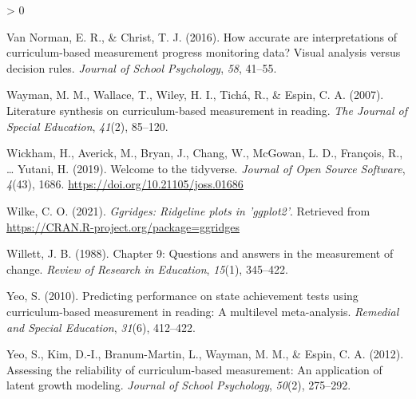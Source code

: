\documentclass[
  english,
  man, fleqn, noextraspace]{apa6}
\newlength{\cslhangindent}
\newenvironment{CSLReferences}[2] %
 {%
  \setlength{\parindent}{0pt}
  \ifodd #1 \everypar{\setlength{\hangindent}{\cslhangindent}}\ignorespaces\fi
  \ifnum #2 > 0
  \setlength{\parskip}{#2\baselineskip}
  \fi
 }%
 {}
\begin{document}
\begin{CSLReferences}{1}{0}
\leavevmode\hypertarget{ref-vannorman2016}{}%
Van Norman, E. R., \& Christ, T. J. (2016). How accurate are interpretations of curriculum-based measurement progress monitoring data? Visual analysis versus decision rules. \emph{Journal of School Psychology}, \emph{58}, 41--55.

\leavevmode\hypertarget{ref-wayman2007}{}%
Wayman, M. M., Wallace, T., Wiley, H. I., Tichá, R., \& Espin, C. A. (2007). Literature synthesis on curriculum-based measurement in reading. \emph{The Journal of Special Education}, \emph{41}(2), 85--120.

\leavevmode\hypertarget{ref-R-tidyverse}{}%
Wickham, H., Averick, M., Bryan, J., Chang, W., McGowan, L. D., François, R., \ldots{} Yutani, H. (2019). Welcome to the {tidyverse}. \emph{Journal of Open Source Software}, \emph{4}(43), 1686. \url{https://doi.org/10.21105/joss.01686}

\leavevmode\hypertarget{ref-R-ggridges}{}%
Wilke, C. O. (2021). \emph{Ggridges: Ridgeline plots in 'ggplot2'}. Retrieved from \url{https://CRAN.R-project.org/package=ggridges}

\leavevmode\hypertarget{ref-willett1988chapter}{}%
Willett, J. B. (1988). Chapter 9: Questions and answers in the measurement of change. \emph{Review of Research in Education}, \emph{15}(1), 345--422.

\leavevmode\hypertarget{ref-yeo2010}{}%
Yeo, S. (2010). Predicting performance on state achievement tests using curriculum-based measurement in reading: A multilevel meta-analysis. \emph{Remedial and Special Education}, \emph{31}(6), 412--422.

\leavevmode\hypertarget{ref-yeoetal2012}{}%
Yeo, S., Kim, D.-I., Branum-Martin, L., Wayman, M. M., \& Espin, C. A. (2012). Assessing the reliability of curriculum-based measurement: An application of latent growth modeling. \emph{Journal of School Psychology}, \emph{50}(2), 275--292.

\end{CSLReferences}

\endgroup

\appendix

\hypertarget{section}{%
\section{}\label{section}}
\end{document}
